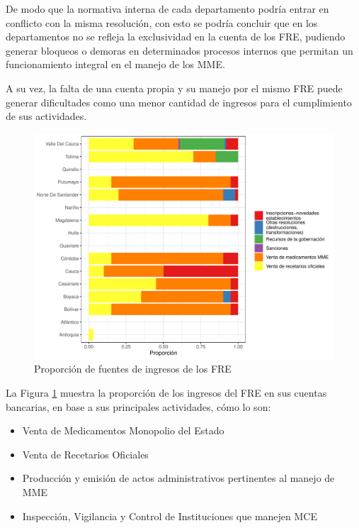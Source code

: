 \documentclass[
  oneside]{book}
\begin{document}
De modo que la normativa interna de cada departamento podría entrar en conflicto con la misma resolución, con esto se podría concluir que en los departamentos no se refleja la exclusividad en la cuenta de los FRE, pudiendo generar bloqueos o demoras en determinados procesos internos que permitan un funcionamiento integral en el manejo de los MME.

A su vez, la falta de una cuenta propia y su manejo por el mismo FRE puede generar dificultades como una menor cantidad de ingresos para el cumplimiento de sus actividades.

\begin{figure}[t]

{\centering \includegraphics[width=0.85\linewidth]{InformeFinal_files/figure-latex/IngresosFRE1-1} 

}

\caption{Proporción de fuentes de ingresos de los FRE}\label{fig:IngresosFRE1}
\end{figure}

La Figura \ref{fig:IngresosFRE1} muestra la proporción de los ingresos del FRE en sus cuentas bancarias, en base a sus principales actividades, cómo lo son:

\begin{itemize}
\item
  Venta de Medicamentos Monopolio del Estado
\item
  Venta de Recetarios Oficiales
\item
  Producción y emisión de actos administrativos pertinentes al manejo de MME
\item
  Inspección, Vigilancia y Control de Instituciones que manejen MCE
\end{itemize}
\end{document}
